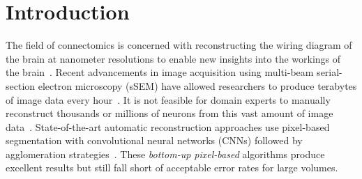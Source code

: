 \section{Introduction}

The field of connectomics is concerned with reconstructing the wiring diagram of the brain at nanometer resolutions to enable new insights into the workings of the brain~\cite{kasthuri2015saturated,haehn2017scalable}. Recent advancements in image acquisition using multi-beam serial-section electron microscopy (sSEM) have allowed researchers to produce terabytes of image data every hour~\cite{hildebrand2017whole}. It is not feasible for domain experts to manually reconstruct thousands or millions of neurons from this vast amount of image data~\cite{haehn2014design}. State-of-the-art automatic reconstruction approaches use pixel-based segmentation with convolutional neural networks (CNNs) followed by agglomeration strategies~\cite{seymour2016rhoananet,nunez2014graph,parag2017anisotropic,zlateski2015image,lee2015recursive,ronneberger2015u}. %
These \textit{bottom-up pixel-based} algorithms produce excellent results but still fall short of acceptable error rates for large volumes.


